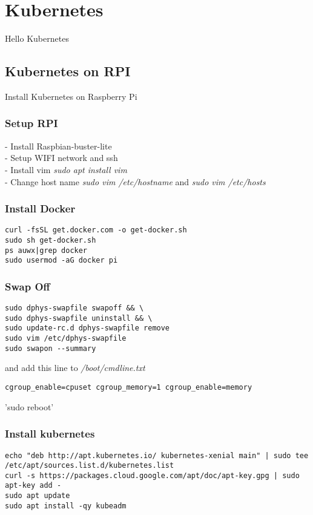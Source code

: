 \section{Kubernetes} \label{K8S}

Hello Kubernetes

\subsection{Kubernetes on RPI}
Install Kubernetes on Raspberry Pi

\subsubsection{Setup RPI}
- Install Raspbian-buster-lite \\
- Setup WIFI network and ssh \\
- Install vim \textit{sudo apt install vim} \\
- Change host name \textit{sudo vim /etc/hostname} and \textit{sudo vim /etc/hosts} \\

\subsubsection{Install Docker}
\begin{verbatim}
curl -fsSL get.docker.com -o get-docker.sh
sudo sh get-docker.sh
ps auwx|grep docker
sudo usermod -aG docker pi
\end{verbatim}

\subsubsection{Swap Off}
\begin{verbatim}
sudo dphys-swapfile swapoff && \ 
sudo dphys-swapfile uninstall && \ 
sudo update-rc.d dphys-swapfile remove 
sudo vim /etc/dphys-swapfile 
sudo swapon --summary
\end{verbatim}

and add this line to \textit{/boot/cmdline.txt} \\

\begin{verbatim}
cgroup_enable=cpuset cgroup_memory=1 cgroup_enable=memory
\end{verbatim}

'sudo reboot'

\subsubsection{Install kubernetes}
\begin{verbatim}
echo "deb http://apt.kubernetes.io/ kubernetes-xenial main" | sudo tee /etc/apt/sources.list.d/kubernetes.list
curl -s https://packages.cloud.google.com/apt/doc/apt-key.gpg | sudo apt-key add -
sudo apt update
sudo apt install -qy kubeadm
\end{verbatim}

